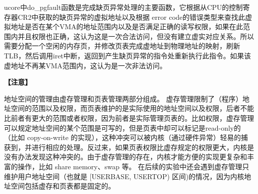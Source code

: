 ucore中do\_pgfault函数是完成缺页异常处理的主要函数，它根据从CPU的控制寄存器CR2中获取的缺页异常的虚拟地址以及根据
error
code的错误类型来查找此虚拟地址是否在某个VMA的地址范围内以及是否满足正确的读写权限，如果在此范围内并且权限也正确，这认为这是一次合法访问，但没有建立虚实对应关系。所以需要分配一个空闲的内存页，并修改页表完成虚地址到物理地址的映射，刷新TLB，然后调用iret中断，返回到产生缺页异常的指令处重新执行此指令。如果该虚地址不再某VMA范围内，这认为是一次非法访问。

\textbf{【注意】}

地址空间的管理由虚存管理和页表管理两部分组成。
虚存管理限制了（程序）地址空间的范围以及权限，而页表维护的是实际使用的地址空间以及权限，后者不能比前者有更大的范围或者权限，因为前者是实际管理页表的。比如权限，虚存管理可以规定地址空间的某个范围是可写的，但是页表中却可以标记是read-only的（比如
copy-on-write
的实现），这种冲突可以被内核（通过硬件异常）轻易的捕获到，并进行相应的处理。反过来，如果页表权限比虚存规定的权限更大，内核是没有办法发现这种冲突的。由于虚存管理的存在，内核才能方便的实现更复杂和丰富的操作，比如
share memory、swap 等。
在后续的实验中还会遇到虚存管理只维护用户地址空间（也就是 {[}USERBASE,
USERTOP) 区间)的情况，因为内核地址空间包括虚存和页表都是固定的。
